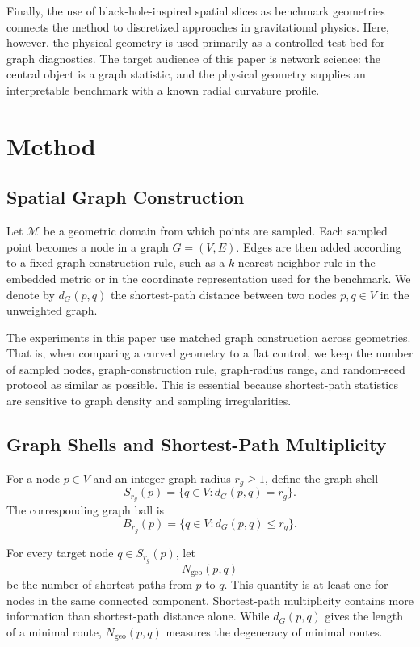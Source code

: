 \documentclass{svproc}
\begin{document}
Finally, the use of black-hole-inspired spatial slices as benchmark geometries connects the method to discretized approaches in gravitational physics. Here, however, the physical geometry is used primarily as a controlled test bed for graph diagnostics. The target audience of this paper is network science: the central object is a graph statistic, and the physical geometry supplies an interpretable benchmark with a known radial curvature profile.

\section{Method}

\subsection{Spatial Graph Construction}

Let $\mathcal{M}$ be a geometric domain from which points are sampled. Each sampled point becomes a node in a graph $G=(V,E)$. Edges are then added according to a fixed graph-construction rule, such as a $k$-nearest-neighbor rule in the embedded metric or in the coordinate representation used for the benchmark. We denote by $d_G(p,q)$ the shortest-path distance between two nodes $p,q\in V$ in the unweighted graph.

The experiments in this paper use matched graph construction across geometries. That is, when comparing a curved geometry to a flat control, we keep the number of sampled nodes, graph-construction rule, graph-radius range, and random-seed protocol as similar as possible. This is essential because shortest-path statistics are sensitive to graph density and sampling irregularities.

\subsection{Graph Shells and Shortest-Path Multiplicity}

For a node $p\in V$ and an integer graph radius $r_g\geq 1$, define the graph shell
\begin{equation}
S_{r_g}(p)=\{q\in V: d_G(p,q)=r_g\}.
\end{equation}
The corresponding graph ball is
\begin{equation}
B_{r_g}(p)=\{q\in V: d_G(p,q)\leq r_g\}.
\end{equation}

For every target node $q\in S_{r_g}(p)$, let
\begin{equation}
N_{\mathrm{geo}}(p,q)
\end{equation}
be the number of shortest paths from $p$ to $q$. This quantity is at least one for nodes in the same connected component. Shortest-path multiplicity contains more information than shortest-path distance alone. While $d_G(p,q)$ gives the length of a minimal route, $N_{\mathrm{geo}}(p,q)$ measures the degeneracy of minimal routes.
\end{document}
